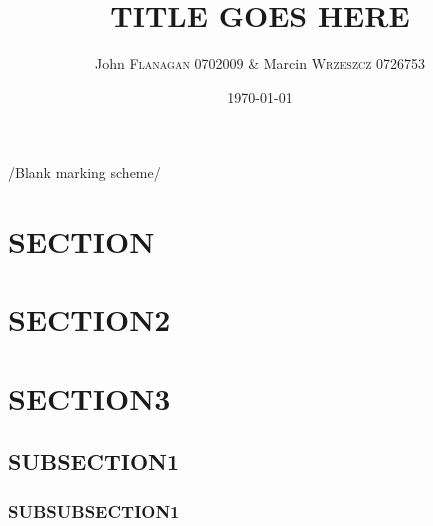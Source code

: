 \documentclass[pdftex,11pt,a4paper]{article}
\author{John \textsc{Flanagan} 0702009 \& Marcin \textsc{Wrzeszcz} 0726753 }
\title{TITLE GOES HERE}
\date{\today}
\begin{document}


\begin{center}
/{Blank marking scheme/}
\end{center}


\pagebreak

\tableofcontents

\pagebreak

\section{SECTION}
\pagebreak
\section{SECTION2}
\newpage
\section{SECTION3}
\subsection{SUBSECTION1}

\subsubsection{SUBSUBSECTION1}
\def\refname{}


\end{document}
